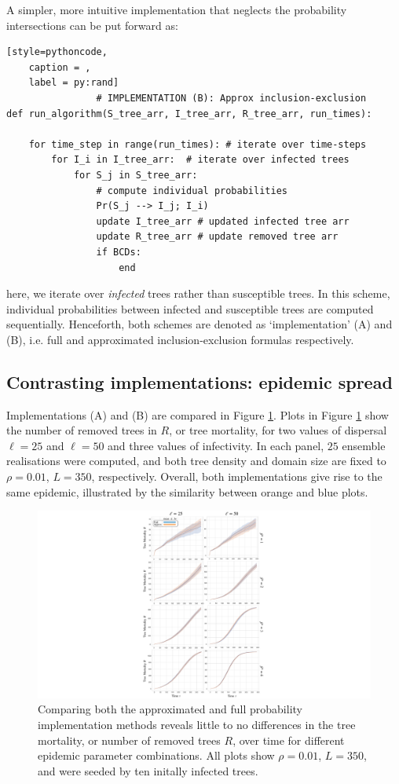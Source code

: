 A simpler, more intuitive implementation that neglects the probability intersections can be put forward as:
\begin{lstlisting}[style=pythoncode,
    caption = ,
    label = py:rand]
                # IMPLEMENTATION (B): Approx inclusion-exclusion
def run_algorithm(S_tree_arr, I_tree_arr, R_tree_arr, run_times):
    
    for time_step in range(run_times): # iterate over time-steps
        for I_i in I_tree_arr:  # iterate over infected trees 
            for S_j in S_tree_arr:
                # compute individual probabilities
                Pr(S_j --> I_j; I_i) 
                update I_tree_arr # updated infected tree arr
                update R_tree_arr # update removed tree arr
                if BCDs:
                    end
\end{lstlisting}
here, we iterate over \textit{infected} trees rather than susceptible trees. 
In this scheme, individual probabilities between infected and susceptible trees are computed sequentially.
Henceforth, both schemes are denoted as `implementation' (A) and (B), i.e. full and approximated inclusion-exclusion formulas respectively.

\subsection{Contrasting implementations: epidemic spread}

Implementations (A) and (B) are compared in Figure \ref{fig:imp-comp}. 
Plots in Figure \ref{fig:imp-comp} show the number of removed trees in $R$, or tree mortality, for two values of dispersal $\ell=25$ and $\ell=50$ and three values of infectivity.
In each panel, $25$ ensemble realisations were computed, and both tree density and domain size are fixed to $\rho=0.01$, $L=350$, respectively.
Overall, both implementations give rise to the same epidemic, illustrated by the similarity between orange and blue plots.

\begin{figure}
    \centering
    \includegraphics[scale=0.60]{chapter5/figures/appendix-implementation.pdf}
    \caption{Comparing both the approximated and full probability implementation methods reveals little to no differences in the tree mortality, or number of removed trees $R$, over time for different epidemic parameter combinations. All plots show $\rho=0.01$, $L=350$, and were seeded by ten initally infected trees. }
    \label{fig:imp-comp}
\end{figure}

